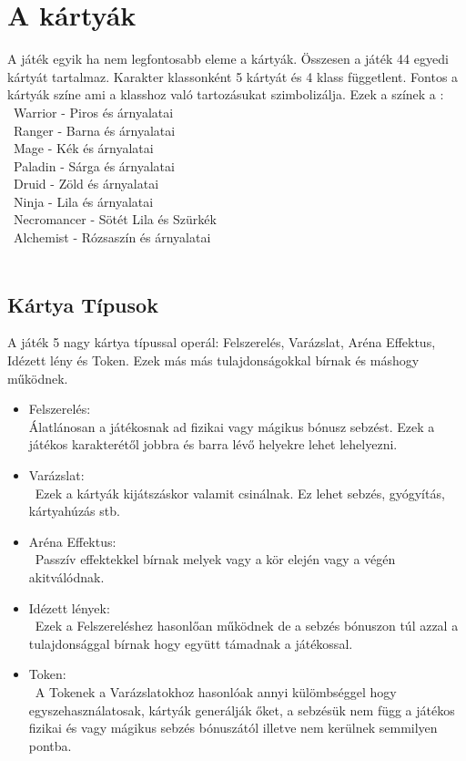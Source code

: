 \chapter{A kártyák}

A játék egyik ha nem legfontosabb eleme a kártyák. Összesen a játék 44 egyedi kártyát tartalmaz. Karakter klassonként 5 kártyát és 4 klass függetlent. Fontos a kártyák színe ami a klasshoz való tartozásukat szimbolizálja. Ezek a színek a :\\\
     Warrior - Piros és árnyalatai \\\
     Ranger - Barna és árnyalatai\\\
     Mage - Kék és árnyalatai\\\
     Paladin - Sárga és árnyalatai\\\
     Druid - Zöld és árnyalatai\\\
     Ninja - Lila és árnyalatai\\\
     Necromancer - Sötét Lila és Szürkék\\\
     Alchemist - Rózsaszín és árnyalatai\\\

\section{Kártya Típusok}
A játék 5 nagy kártya típussal operál: Felszerelés, Varázslat, Aréna Effektus, Idézett lény és Token. Ezek más más tulajdonságokkal bírnak és máshogy működnek.
\begin{itemize}
    \item Felszerelés:\\
    Álatlánosan a játékosnak ad fizikai vagy mágikus bónusz sebzést. Ezek a játékos karakterétől jobbra és barra lévő helyekre lehet lehelyezni.
    \item Varázslat:\\\
    Ezek a kártyák kijátszáskor valamit csinálnak. Ez lehet sebzés, gyógyítás, kártyahúzás stb.
    \item Aréna Effektus:\\\
    Passzív effektekkel bírnak melyek vagy a kör elején vagy a végén akitválódnak.
    \item Idézett lények:\\\
    Ezek a Felszereléshez hasonlőan működnek de a sebzés bónuszon túl azzal a tulajdonsággal bírnak hogy együtt támadnak a játékossal.
    \item Token:\\\
    A Tokenek a Varázslatokhoz hasonlóak annyi külömbséggel hogy egyszehasználatosak, kártyák generálják őket, a sebzésük nem függ a játékos fizikai és vagy mágikus sebzés bónuszától illetve nem kerülnek semmilyen pontba. 
\end{itemize}

